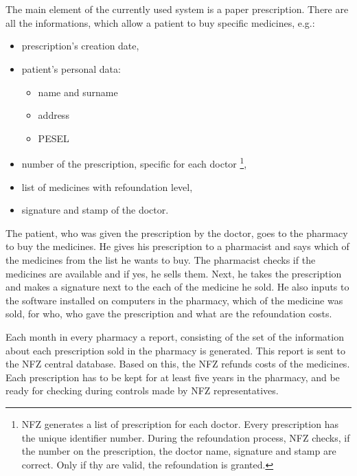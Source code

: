 \chapter{   }

The main element of the currently used system is a paper prescription. There are all the informations, which allow a patient to buy specific medicines, e.g.: 

\begin{itemize}
  \item prescription’s creation date,
  \item patient’s personal data:
  \begin{itemize}
	  \item name and surname
	  \item address
	  \item PESEL
  \end{itemize}
  \item number of the prescription, specific for each doctor \footnote{NFZ generates a list of prescription for each doctor. Every prescription has the unique identifier number. During the refoundation process, NFZ checks, if the number on the prescription, the doctor name, signature and stamp are correct. Only if thy are valid, the refoundation is granted.  },
  \item list of medicines with refoundation level,
  \item signature and stamp of the doctor. 
\end{itemize}

The patient, who was given the prescription by the doctor, goes to the pharmacy to buy the medicines. He gives his prescription to a pharmacist and says which of the medicines from the list he wants to buy. The pharmacist checks if the medicines are available and if yes, he sells them. Next, he takes the prescription and makes a signature next to the each of the medicine he sold. He also inputs to the software installed on computers in the pharmacy, which of the medicine was sold, for who, who gave the prescription and what are the refoundation costs.

Each month in every pharmacy a report, consisting of  the set of the information about each prescription sold in the pharmacy is generated. This report is sent to the NFZ central database. Based on this, the NFZ refunds costs of the medicines. Each prescription has to be kept for at least five years in the pharmacy, and be ready for checking during controls made by NFZ representatives. 

